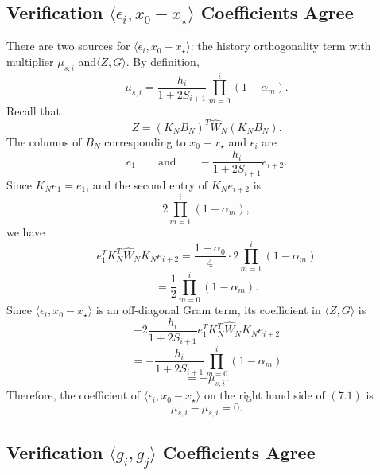 {\subsection{Verification $\langle \epsilon_i, x_0-x_\star\rangle$ Coefficients Agree}
There are two sources for $\langle \epsilon_i,x_0-x_\star\rangle$:
the history orthogonality term with multiplier $\mu_{s,i}$ and$\langle Z,G\rangle$.
By definition,
\[\mu_{s,i}=\frac{h_i}{1+2S_{i+1}}\prod_{m=0}^{i}(1-\alpha_m).\]
Recall that
\[Z=(K_NB_N)^T\widehat{W}_N(K_NB_N).\]
The columns of $B_N$ corresponding to $x_0-x_\star$ and $\epsilon_i$ are
\[e_1\qquad\text{and}\qquad-\frac{h_i}{1+2S_{i+1}}e_{i+2}.\]
Since $K_Ne_1=e_1$, and the second entry of $K_Ne_{i+2}$ is
\[2\prod_{m=1}^{i}(1-\alpha_m),\]
we have\[e_1^TK_N^T\widehat{W}_NK_Ne_{i+2}=\frac{1-\alpha_0}{4}\cdot2\prod_{m=1}^{i}(1-\alpha_m)\]
\[=\frac{1}{2}\prod_{m=0}^{i}(1-\alpha_m).\]
Since $\langle \epsilon_i,x_0-x_\star\rangle$ is an off-diagonal Gram term,
its coefficient in $\langle Z,G\rangle$ is
\[-2\frac{h_i}{1+2S_{i+1}}e_1^TK_N^T\widehat{W}_NK_Ne_{i+2}\]
\[=-\frac{h_i}{1+2S_{i+1}}\prod_{m=0}^{i}(1-\alpha_m)\]
\[=-\mu_{s,i}.\]
Therefore, the coefficient of $\langle \epsilon_i,x_0-x_\star\rangle$ on the right hand side of $(7.1)$ is \[\mu_{s,i}-\mu_{s,i}=0.\]

\subsection{Verification $\langle g_i, g_j\rangle$ Coefficients Agree}
}
